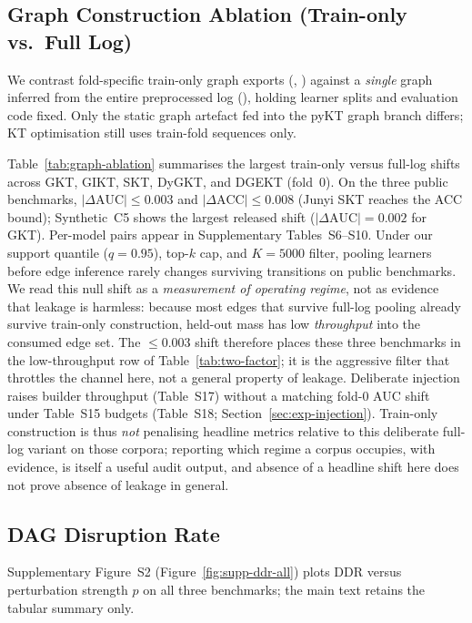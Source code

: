 \documentclass[pdflatex,sn-mathphys-num]{sn-jnl}
\newcommand{\DDR}{\textsc{DDR}}
\begin{document}
\subsection{Graph Construction Ablation (Train-only vs.\ Full Log)}
\label{sec:exp-graph-ablation}
We contrast fold-specific train-only graph exports
(, ) against a
\emph{single} graph inferred from the entire preprocessed log
(), holding learner splits and
evaluation code fixed. Only the static graph artefact fed into the pyKT graph
branch differs; KT optimisation still uses train-fold sequences only.


Table~\ref{tab:graph-ablation} summarises the largest train-only versus
full-log shifts across GKT, GIKT, SKT, DyGKT, and DGEKT (fold~0).
On the three public benchmarks, $|\Delta\text{AUC}|{\leq}0.003$ and
$|\Delta\text{ACC}|{\leq}0.008$ (Junyi SKT reaches the ACC bound);
Synthetic~C5 shows the largest released shift
($|\Delta\text{AUC}|{=}0.002$ for GKT). Per-model pairs appear in
Supplementary Tables~S6--S10. Under our support quantile ($q{=}0.95$),
top-$k$ cap, and $K{=}5000$ filter, pooling learners before edge inference
rarely changes surviving transitions on public benchmarks. We read this null
shift as a \emph{measurement of operating regime}, not as evidence that
leakage is harmless: because most edges that survive full-log pooling already
survive train-only construction, held-out mass has low \emph{throughput} into
the consumed edge set. The ${\leq}0.003$ shift therefore places these three
benchmarks in the low-throughput row of Table~\ref{tab:two-factor}; it is the
aggressive filter that throttles the channel here, not a general property of
leakage. Deliberate injection raises builder throughput (Table~S17) without a
matching fold-0 AUC shift under Table~S15 budgets (Table~S18;
Section~\ref{sec:exp-injection}). Train-only construction is
thus \emph{not} penalising headline metrics relative to this deliberate
full-log variant on those corpora; reporting which regime a corpus occupies,
with evidence, is itself a useful audit output, and absence of a headline
shift here does not prove absence of leakage in general.

\subsection{DAG Disruption Rate}
\label{sec:exp-ddr}
Supplementary Figure~S2 (Figure~\ref{fig:supp-ddr-all}) plots \DDR{} versus
perturbation strength $p$ on all three benchmarks; the main text retains the
tabular summary only.
\end{document}

